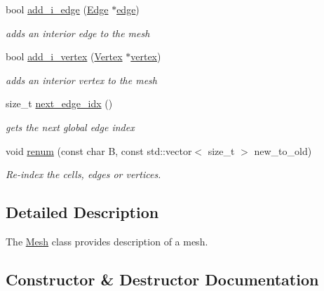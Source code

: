 \begin{DoxyCompactItemize}
bool \hyperlink{group__Mesh_ga1e55100bee1027f4ab3980bf020c5df7}{add\+\_\+i\+\_\+edge} (\hyperlink{classHArDCore2D_1_1Edge}{Edge} $\ast$\hyperlink{classHArDCore2D_1_1Mesh_acad7cdf3d2c00fa6fc23ff77c63c7d1a}{edge})
\begin{DoxyCompactList}\small\item\em adds an interior edge to the mesh \end{DoxyCompactList}\item 
bool \hyperlink{group__Mesh_gae0eac0c28f63b2106e97e595cb95248e}{add\+\_\+i\+\_\+vertex} (\hyperlink{classHArDCore2D_1_1Vertex}{Vertex} $\ast$\hyperlink{classHArDCore2D_1_1Mesh_ad099224c697c05a57fad6a47fdcd9e76}{vertex})
\begin{DoxyCompactList}\small\item\em adds an interior vertex to the mesh \end{DoxyCompactList}\item 
size\+\_\+t \hyperlink{group__Mesh_ga950e099c278cd367de1a87c6dcaefafe}{next\+\_\+edge\+\_\+idx} ()
\begin{DoxyCompactList}\small\item\em gets the next global edge index \end{DoxyCompactList}\item 
void \hyperlink{classHArDCore2D_1_1Mesh_af77873bbc892a7a5b37bf4773c55aefc}{renum} (const char B, const std\+::vector$<$ size\+\_\+t $>$ new\+\_\+to\+\_\+old)
\begin{DoxyCompactList}\small\item\em Re-\/index the cells, edges or vertices. \end{DoxyCompactList}\end{DoxyCompactItemize}


\subsection{Detailed Description}
The \hyperlink{classHArDCore2D_1_1Mesh}{Mesh} class provides description of a mesh. 

\subsection{Constructor \& Destructor Documentation}
\mbox{\label{classHArDCore2D_1_1Mesh_a2af137f1571af89172b9c102302c416b}} 
